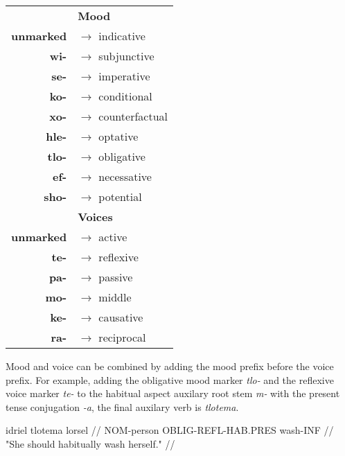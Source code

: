 \begin{tabular}{rl}
&\textbf{Mood}\\
\textbf{unmarked}& $\rightarrow$ indicative \\
\textbf{wi-}& $\rightarrow$ subjunctive \\
\textbf{se-}& $\rightarrow$ imperative \\
\textbf{ko-} & $\rightarrow$ conditional \\
\textbf{xo-}& $\rightarrow$ counterfactual \\
\textbf{hle-}& $\rightarrow$ optative \\
\textbf{tlo-}& $\rightarrow$ obligative \\
\textbf{ef-}& $\rightarrow$ necessative \\
\textbf{sho-}& $\rightarrow$ potential \\



&\textbf{Voices}\\
\textbf{unmarked}& $\rightarrow$ active \\
\textbf{te-}& $\rightarrow$ reflexive \\
\textbf{pa-}& $\rightarrow$ passive \\
\textbf{mo-}& $\rightarrow$ middle \\
\textbf{ke-}& $\rightarrow$ causative \\
\textbf{ra-}& $\rightarrow$ reciprocal \\


\end{tabular}

\medskip

Mood and voice can be combined by adding the mood prefix before the voice prefix. For example, adding the obligative mood marker \textit{tlo-} and the reflexive voice marker \textit{te-} to the habitual aspect auxilary root stem \textit{m-} with the present tense conjugation \textit{-a}, the final auxilary verb is \textit{tlotema}. 

\ex
\begingl
\gla idriel tlotema lorsel //
\glb NOM-person OBLIG-REFL-HAB.PRES wash-INF //
\glft "She should habitually wash herself." //
\endgl
\xe



